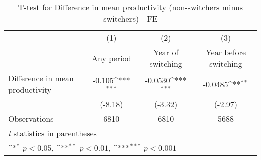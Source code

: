 \begin{table}[htbp]\centering
\def\sym#1{\ifmmode^{#1}\else\(^{#1}\)\fi}
\caption{T-test for Difference in mean productivity (non-switchers minus switchers) - FE}
\begin{tabular}{l*{3}{c}}
\hline\hline
                    &\multicolumn{1}{c}{(1)}&\multicolumn{1}{c}{(2)}&\multicolumn{1}{c}{(3)}\\
                    &\multicolumn{1}{c}{Any period}&\multicolumn{1}{c}{Year of switching}&\multicolumn{1}{c}{Year before switching}\\
\hline
Difference in mean productivity&      -0.105\sym{***}&     -0.0530\sym{***}&     -0.0485\sym{**} \\
                    &     (-8.18)         &     (-3.32)         &     (-2.97)         \\
\hline
Observations        &        6810         &        6810         &        5688         \\
\hline\hline
\multicolumn{4}{l}{\footnotesize \textit{t} statistics in parentheses}\\
\multicolumn{4}{l}{\footnotesize \sym{*} \(p<0.05\), \sym{**} \(p<0.01\), \sym{***} \(p<0.001\)}\\
\end{tabular}
\end{table}
